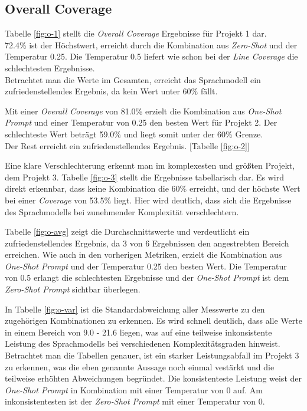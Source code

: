\subsection{Overall Coverage}
Tabelle \ref{fig:o-1} stellt die \textit{Overall Coverage} Ergebnisse für Projekt 1 dar. \\72.4\% ist der Höchstwert, erreicht durch die Kombination aus \textit{Zero-Shot} und der Temperatur 0.25. Die Temperatur 0.5 liefert wie schon bei der \textit{Line Coverage}  die schlechtesten Ergebnisse.\\ Betrachtet man die Werte im Gesamten, erreicht das Sprachmodell ein zufriedenstellendes Ergebnis, da kein Wert unter 60\% fällt.

Mit einer \textit{Overall Coverage}  von 81.0\% erzielt die Kombination aus \textit{One-Shot Prompt} und einer Temperatur von 0.25 den besten Wert für Projekt 2. Der schlechteste Wert beträgt 59.0\% und liegt somit unter der 60\% Grenze.\\ Der Rest erreicht ein zufriedenstellendes Ergebnis. [Tabelle \ref{fig:o-2}]

Eine klare Verschlechterung erkennt man im komplexesten und größten Projekt, dem Projekt 3. Tabelle \ref{fig:o-3} stellt die Ergebnisse tabellarisch dar. Es wird direkt erkennbar, dass keine Kombination die 60\% erreicht, und der höchste Wert bei einer \textit{Coverage} von 53.5\% liegt. Hier wird deutlich, dass sich die Ergebnisse des Sprachmodells bei zunehmender Komplexität verschlechtern.

Tabelle \ref{fig:o-avg} zeigt die Durchschnittswerte und verdeutlicht ein zufriedenstellendes Ergebnis, da 3 von 6 Ergebnissen den angestrebten Bereich erreichen. Wie auch in den vorherigen Metriken, erzielt die Kombination aus \textit{One-Shot Prompt} und der Temperatur 0.25 den besten Wert. Die Temperatur von 0.5 erlangt die schlechtesten Ergebnisse und der \textit{One-Shot Prompt} ist dem \textit{Zero-Shot Prompt} sichtbar überlegen.

In Tabelle \ref{fig:o-var} ist die Standardabweichung aller Messwerte zu den zugehörigen Kombinationen zu erkennen. Es wird schnell deutlich, dass alle Werte in einem Bereich von 9.0 - 21.6 liegen, was auf eine teilweise inkonsistente Leistung des Sprachmodells bei verschiedenen Komplexitätsgraden hinweist. Betrachtet man die Tabellen genauer, ist ein starker Leistungsabfall im Projekt 3 zu erkennen, was die eben genannte Aussage noch einmal vestärkt und die teilweise erhöhten Abweichungen begründet. Die konsistenteste Leistung weist der \textit{One-Shot Prompt} in Kombination mit einer Temperatur von 0 auf. Am inkonsistentesten ist der \textit{Zero-Shot Prompt} mit einer Temperatur von 0.


